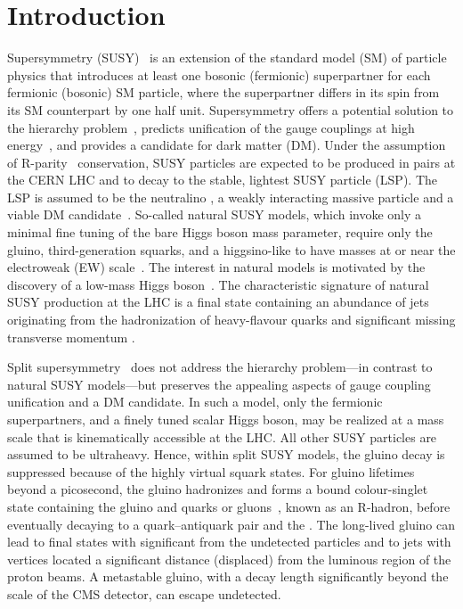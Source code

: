 \maketitle

\section{Introduction}
\label{sec:introduction}

Supersymmetry (SUSY)~\cite{ref:SUSY-1, ref:SUSY0, ref:SUSY3,
  ref:SUSY1} is an extension of the standard model (SM) of particle
physics that introduces at least one bosonic (fermionic) superpartner
for each fermionic (bosonic) SM particle, where the superpartner
differs in its spin from its SM counterpart by one half unit.
Supersymmetry offers a potential solution to the hierarchy
problem~\cite{ref:hierarchy1, ref:hierarchy2}, predicts unification of
the gauge couplings at high energy~\cite{Dimopoulos:1981yj,
  Ibanez:1981yh, Marciano:1981un}, and provides a candidate for dark
matter (DM). Under the assumption of R-parity~\cite{Farrar:1978xj}
conservation, SUSY particles are expected to be produced in pairs at
the CERN LHC and to decay to the stable, lightest SUSY particle
(LSP). The LSP is assumed to be the neutralino \PSGczDo, a weakly
interacting massive particle and a viable DM
candidate~\cite{Jungman:1995df, Patrignani:2016xqp}.  So-called
natural SUSY models, which invoke only a minimal fine tuning of the
bare Higgs boson mass parameter, require only the gluino,
third-generation squarks, and a higgsino-like \PSGczDo to have masses
at or near the electroweak (EW) scale~\cite{ref:barbierinsusy}. The
interest in natural models is motivated by the discovery of a low-mass
Higgs boson~\cite{Aad:2012tfa, Chatrchyan:2012ufa, Chatrchyan:2013lba,
  Khachatryan:2014jba, Aad:2014aba, Aad:2015zhl}. The characteristic
signature of natural SUSY production at the LHC is a final state
containing an abundance of jets originating from the hadronization of
heavy-flavour quarks and significant missing transverse momentum
\ptvecmiss.

Split supersymmetry~\cite{ArkaniHamed:2004fb, Giudice:2004tc} does not
address the hierarchy problem---in contrast to natural SUSY
models---but preserves the appealing aspects of gauge coupling
unification and a DM candidate. In such a model, only the fermionic
superpartners, and a finely tuned scalar Higgs boson, may be realized
at a mass scale that is kinematically accessible at the LHC. All other
SUSY particles are assumed to be ultraheavy. Hence, within split SUSY
models, the gluino decay is suppressed because of the highly virtual
squark states. For gluino lifetimes beyond a picosecond, the gluino
hadronizes and forms a bound colour-singlet state containing the
gluino and quarks or gluons~\cite{Fairbairn:2006gg}, known as an
R-hadron, before eventually decaying to a quark--antiquark pair and
the \PSGczDo. The long-lived gluino can lead to final states with
significant \ptvecmiss from the undetected \PSGczDo particles and to
jets with vertices located a significant distance (\ie displaced) from
the luminous region of the proton beams. A metastable gluino, with a
decay length significantly beyond the scale of the CMS detector, can
escape undetected.

